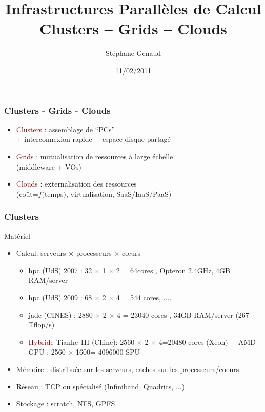 \documentclass{beamer}
\title[]{Infrastructures Parallèles de Calcul\\ {\large Clusters -- Grids -- Clouds}}
\author[~~~Stéphane Genaud]{Stéphane Genaud} \date{11/02/2011}
\begin{document}
\frame{\titlepage}


\begin{frame}
\frametitle{Clusters - Grids - Clouds}
  \begin{block}{}
    \begin{itemize}
    \item<+-> \textcolor{darkred}{Clusters} : assemblage de ``PCs''\\+ interconnexion rapide + espace disque partagé  
    \item<+-> \textcolor{darkred}{Grids} : mutualisation de ressources à large échelle\\ (middleware + VOs)
    \item<+-> \textcolor{darkred}{Clouds} : externalisation des ressources\\ (coût=$f($temps$)$, virtualisation, SaaS/IaaS/PaaS)
    \end{itemize}
 \end{block}
\end{frame}



\begin{frame}
\frametitle{Clusters}
  \begin{block}{Matériel}
    \begin{itemize}
    \item Calcul: serveurs $\times$ processeurs $\times$ c{\oe}urs
    		\begin{itemize}
		\item<+->hpc (UdS) 2007 : 32 $\times$ 1 $\times$ 2 = 64cores , Opteron 2.4GHz, 4GB RAM/server
		\item<+->hpc (UdS) 2009 : 68 $\times$ 2 $\times$ 4 = 544 cores, ....
		\item<+->jade (CINES) : 2880 $\times$ 2 $\times$ 4 = 23040 cores , 34GB RAM/server (267 Tflop/s)
		\item<+->\textcolor{darkred}{Hybride} Tianhe-1H (Chine): 2560 $\times$ 2 $\times$ 4=20480 cores (Xeon) + AMD GPU : 2560 $\times$ 1600= 4096000 SPU 
    		\end{itemize}
    \item<+-> Mémoire : distribuée sur les serveurs, caches sur les processeurs/coeurs
    \item<+-> Réseau : TCP ou spécialisé (Infiniband, Quadrics, ...)
    \item<+-> Stockage : scratch, NFS, GPFS
    \end{itemize}
  \end{block}
\hfill
\end{frame}
\end{document}
